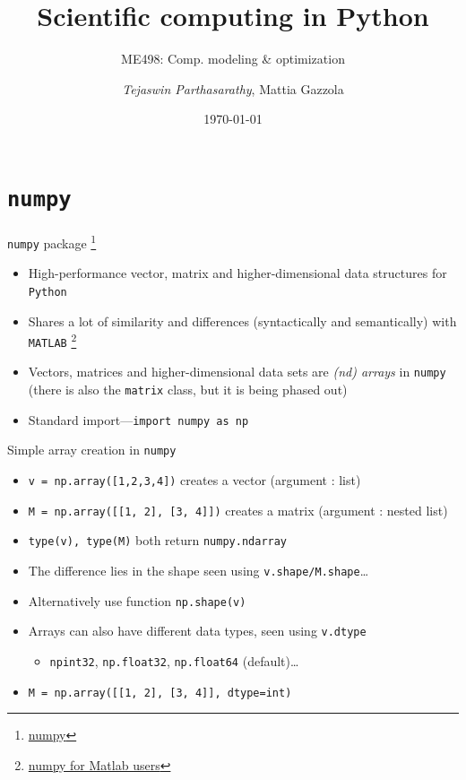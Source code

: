 \documentclass[presentation]{beamer}
\author{\emph{Tejaswin Parthasarathy}, Mattia Gazzola}
\date{\today}
\title{Scientific computing in Python}
\subtitle{ME498: Comp. modeling \& optimization}
\begin{document}
\maketitle

\section{\texttt{numpy}}
\label{sec:orgcab7e74}
\begin{frame}[label={sec:org3d4c8d2},fragile]{\texttt{numpy} package \footnote{\href{https://www.numpy.org/}{numpy}}}
 \begin{itemize}
\item High-performance vector, matrix and higher-dimensional data structures for
\texttt{Python}
\item Shares a lot of similarity and differences (syntactically and semantically)
with \texttt{MATLAB} \footnote{\href{https://docs.scipy.org/doc/numpy/user/numpy-for-matlab-users.html}{numpy for Matlab users}}
\item Vectors, matrices and higher-dimensional data sets are \emph{(nd) arrays} in \texttt{numpy}
(there is also the \texttt{matrix} class, but it is being phased out)
\item Standard import---\texttt{import numpy as np}
\end{itemize}
\end{frame}
\begin{frame}[label={sec:orgd37e6fd},fragile]{Simple array creation in \texttt{numpy}}
\begin{itemize}
\item \texttt{v = np.array([1,2,3,4])} creates a vector (argument : list)
\item \texttt{M = np.array([[1, 2], [3, 4]])} creates a matrix (argument : nested list)
\item \texttt{type(v), type(M)} both return \texttt{numpy.ndarray}
\item The difference lies in the \alert{shape} seen using \texttt{v.shape/M.shape}\ldots{}
\item Alternatively use function \texttt{np.shape(v)}
\item Arrays can also have different data types, seen using \texttt{v.dtype}
\begin{itemize}
\item \texttt{npint32}, \texttt{np.float32}, \texttt{np.float64} (default)\ldots{}
\end{itemize}
\item \texttt{M = np.array([[1, 2], [3, 4]], dtype=int)}
\end{itemize}
\end{frame}
\end{document}
